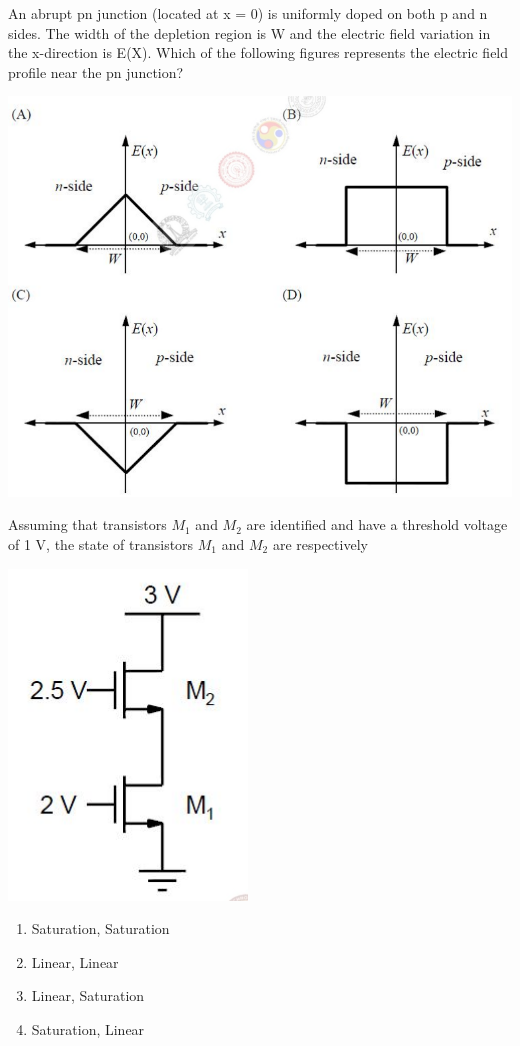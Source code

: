 \item An abrupt pn junction (located at x = 0) is uniformly doped on both p and n sides. The width of the depletion region is W and the electric field variation in the x-direction is E(X). Which of the following figures represents the electric field profile near the pn junction?

\includegraphics[scale=0.3]{39}

\item Assuming that transistors $M_{1}$ and $M_{2}$ are identified and have a threshold voltage of 1 V, the state of transistors $M_{1}$ and $M_{2}$ are respectively

\includegraphics[scale=0.4]{40}

\begin{enumerate}
\item Saturation, Saturation 
\item Linear, Linear
\item Linear, Saturation
\item Saturation, Linear
\end{enumerate}


